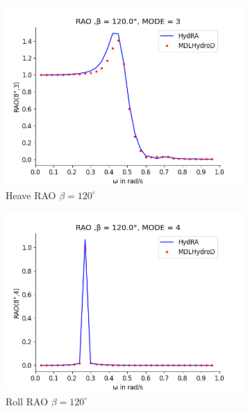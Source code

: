 \begin{figure}[H]
    \vspace{5pt}%
    \begin{subfigure}[b]{0.49\textwidth}
        \includegraphics[width=\textwidth]{plots/kvlcc/rao/rao3.png}
        \caption{Heave RAO $\beta = 120^{\circ}$}
    \end{subfigure}
    \begin{subfigure}[b]{0.49\textwidth}
        \includegraphics[width=\textwidth]{plots/kvlcc/rao/rao4.png}
        \caption{Roll RAO $\beta = 120^{\circ}$}
    \end{subfigure}
    \vspace{5pt}%
    \begin{subfigure}[b]{0.49\textwidth}

\end{subfigure}
\end{figure}
